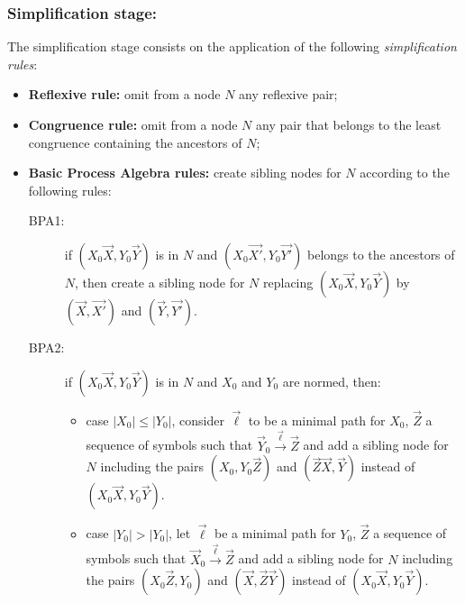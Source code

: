 \subsubsection{Simplification stage:} The simplification stage consists on the 
application of the following \emph{simplification rules}:
\begin{itemize}
	\item {\bf Reflexive rule:} omit from a node $N$ any reflexive pair;
	\item {\bf Congruence rule:}  omit from a node $N$ any pair that 
	      belongs to the least congruence containing the ancestors of $N$;
	\item {\bf Basic Process Algebra rules:} create sibling nodes for $N$ 
		  according to the following rules:
		  \begin{description}
		  	\item[BPA1:] if $(X_0 \vec X, Y_0 \vec Y)$ is in $N$ and $(X_0 
		  		  \vec {X'}, Y_0 \vec {Y'})$ belongs to the ancestors of $N$, 
		  		  then create a sibling node for $N$ replacing $(X_0 \vec X, 
		  		  Y_0 \vec Y)$ by $(\vec X, \vec {X'})$ and $(\vec Y, \vec {Y'})$.
		  	\item[BPA2:] if $(X_0 \vec X, Y_0 \vec Y)$ is in $N$ and $X_0$ and 
		  	$Y_0$ are normed, then:
		  	\begin{itemize}[label=$\bullet$]
		  		\item case $|X_0| \leq |Y_0|$, consider $\vec \ell$ to be a minimal 
		  	          path for $X_0$, $\vec Z$ a sequence of symbols such that 
		  	          $\vec Y_0 \xrightarrow{\vec \ell} \vec Z$ and add a sibling node 
		  	          for $N$ including the pairs $(X_0, Y_0 \vec Z)$ 
		  	          and $(\vec Z \vec X, \vec Y)$ instead of 
		  	          $(X_0 \vec X, Y_0 \vec Y)$.
		  	     \item case $|Y_0| > |Y_0|$, let $\vec \ell$ be a minimal 
		  	          path for $Y_0$, $\vec Z$ a sequence of symbols such that 
		  	          $\vec X_0 \xrightarrow{\vec \ell} \vec Z$ and add a sibling node 
		  	          for $N$ including the pairs $(X_0 \vec Z, Y_0 )$ 
		  	          and $(\vec X, \vec Z \vec Y)$ instead of 
		  	          $(X_0 \vec X, Y_0 \vec Y)$.
		  	\end{itemize}
		  \end{description}
\end{itemize}

